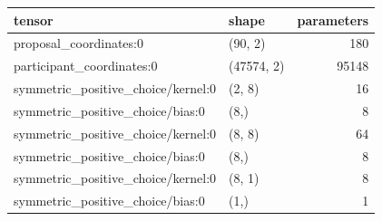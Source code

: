 \begin{tabular}{llr}
\toprule
tensor & shape & parameters \\
\midrule
proposal_coordinates:0 & (90, 2) & 180 \\
participant_coordinates:0 & (47574, 2) & 95148 \\
symmetric_positive_choice/kernel:0 & (2, 8) & 16 \\
symmetric_positive_choice/bias:0 & (8,) & 8 \\
symmetric_positive_choice/kernel:0 & (8, 8) & 64 \\
symmetric_positive_choice/bias:0 & (8,) & 8 \\
symmetric_positive_choice/kernel:0 & (8, 1) & 8 \\
symmetric_positive_choice/bias:0 & (1,) & 1 \\
\bottomrule
\end{tabular}
